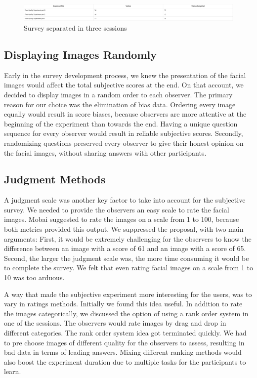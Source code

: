 \begin{figure}[h]
    \centering
    \includegraphics[scale = 0.2]{figures/three-sessions.png}
    \caption{Survey separated in three sessions}
    \label{fig:three-sessions}
\end{figure}

\newpage 

\subsection*{Displaying Images Randomly}
Early in the survey development process, we knew the presentation of the facial images would affect the total subjective scores at the end. On that account, we decided to display images in a random order to each observer. The primary reason for our choice was the elimination of bias data. Ordering every image equally would result in score biases, because observers are more attentive at the beginning of the experiment than towards the end. Having a unique question sequence for every observer would result in reliable subjective scores. 
Secondly, randomizing questions preserved every observer to give their honest opinion on the facial images, without sharing answers with other participants.

\subsection*{Judgment Methods}
A judgment scale was another key factor to take into account for the subjective survey. We needed to provide the observers an easy scale to rate the facial images. Mobai suggested to rate the images on a scale from 1 to 100, because both metrics provided this output. We suppressed the proposal, with two main arguments: First, it would be extremely challenging for the observers to know the difference between an image with a score of 61 and an image with a score of 65. Second, the larger the judgment scale was, the more time consuming it would be to complete the survey. We felt that even rating facial images on a scale from 1 to 10 was too arduous. 

A way that made the subjective experiment more interesting for the users, was to vary in ratings methods. Initially we found this idea useful. In addition to rate the images categorically, we discussed the option of using a rank order system in one of the sessions. The observers would rate images by drag and drop in different categories. The rank order system idea got terminated quickly. We had to pre choose images of different quality for the observers to assess, resulting in bad data in terms of leading answers. Mixing different ranking methods would also boost the experiment duration due to multiple tasks for the participants to learn. 

